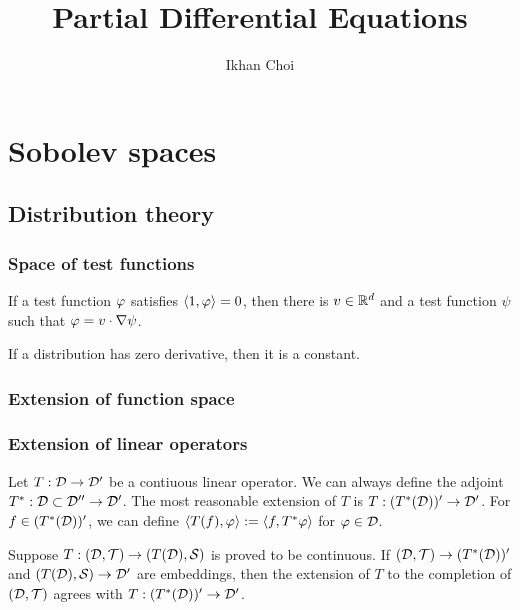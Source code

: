 \documentclass{../note}
\begin{document}
\title{Partial Differential Equations}
\author{Ikhan Choi}
\maketitle
\tableofcontents


\part{Sobolev spaces}

\chapter{Distribution theory}
\section{Space of test functions}
\begin{prb}
\begin{parts}
\item If a test function $\varphi$ satisfies $\langle1,\varphi\rangle=0$, then there is $v\in\mathbb{R}^d$ and a test function $\psi$ such that $\varphi=v\cdot\nabla\psi$.
\item If a distribution has zero derivative, then it is a constant.
\end{parts}
\end{prb}
\begin{prb}
\end{prb}

\section{Extension of function space}
\begin{prb}

\end{prb}

\section{Extension of linear operators}

Let $T:\mathcal{D}\to\mathcal{D}'$ be a contiuous linear operator.
We can always define the adjoint $T^*:\mathcal{D}\subset\mathcal{D}''\to\mathcal{D}'$.
The most reasonable extension of $T$ is $T:(T^*(\mathcal{D}))'\to\mathcal{D}'$.
For $f\in(T^*(\mathcal{D}))'$, we can define $\langle T(f),\varphi\rangle:=\langle f,T^*\varphi\rangle$ for $\varphi\in\mathcal{D}$.

Suppose $T:(\mathcal{D},\mathcal{T})\to(T(\mathcal{D}),\mathcal{S})$ is proved to be continuous.
If $(\mathcal{D},\mathcal{T})\to(T^*(\mathcal{D}))'$ and $(T(\mathcal{D}),\mathcal{S})\to\mathcal{D}'$ are embeddings, then the extension of $T$ to the completion of $(\mathcal{D},\mathcal{T})$ agrees with $T:(T^*(\mathcal{D}))'\to\mathcal{D}'$.
\end{document}
